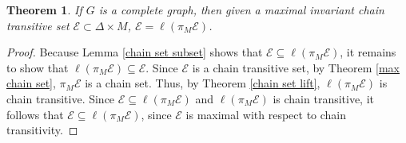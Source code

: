 \documentclass[11pt]{article}
\newtheorem{thm}{Theorem}
\begin{document}
\begin{thm}\label{complete graph}
If $G$ is a complete graph, then given a maximal invariant chain transitive set $\mathcal{E}\subset \Delta\times M$, $\mathcal{E}=\ell(\pi_M\mathcal{E})$.
\end{thm}
\begin{proof}
Because Lemma \ref{chain set subset} shows that $\mathcal{E}\subseteq\ell(\pi_M\mathcal{E})$, it remains to show that $\ell(\pi_M\mathcal{E})\subseteq\mathcal{E}$. Since $\mathcal{E}$ is a chain transitive set, by Theorem \ref{max chain set}, $\pi_M\mathcal{E}$ is a chain set.  Thus, by Theorem \ref{chain set lift}, $\ell(\pi_M\mathcal{E})$ is chain transitive.  
Since $\mathcal{E}\subseteq \ell(\pi_M\mathcal{E})$ and $\ell(\pi_M\mathcal{E})$ is chain transitive, it follows that $\mathcal{E}\subseteq\ell(\pi_M\mathcal{E})$, since $\mathcal{E}$ is maximal with respect to chain transitivity. 
\end{proof}




\end{document}
